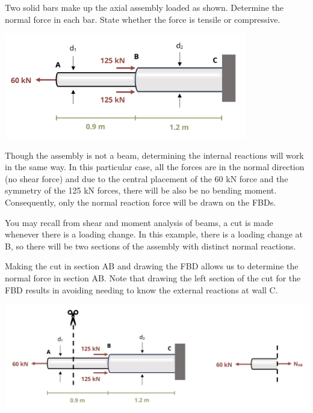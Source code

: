 \documentclass[
  letterpaper,
  DIV=11,
  numbers=noendperiod]{scrreprt}
\begin{document}
\begin{tcolorbox}[enhanced jigsaw, colbacktitle=quarto-callout-note-color!10!white, title={Example 1.5}, coltitle=black, leftrule=.75mm, rightrule=.15mm, opacityback=0, breakable, colframe=quarto-callout-note-color-frame, left=2mm, arc=.35mm, colback=white, bottomrule=.15mm, bottomtitle=1mm, toptitle=1mm, titlerule=0mm, opacitybacktitle=0.6, toprule=.15mm]

Two solid bars make up the axial assembly loaded as shown. Determine the
normal force in each bar. State whether the force is tensile or
compressive.

\begin{center}
\includegraphics[width=4.16667in,height=\textheight]{images/CH1 PNGs/example 1.5 part 1.png}
\end{center}

Though the assembly is not a beam, determining the internal reactions
will work in the same way. In this particular case, all the forces are
in the normal direction (no shear force) and due to the central
placement of the 60 kN force and the symmetry of the 125 kN forces,
there will be also be no bending moment. Consequently, only the normal
reaction force will be drawn on the FBDs.

You may recall from shear and moment analysis of beams, a cut is made
whenever there is a loading change. In this example, there is a loading
change at B, so there will be two sections of the assembly with distinct
normal reactions.

Making the cut in section AB and drawing the FBD allows us to determine
the normal force in section AB. Note that drawing the left section of
the cut for the FBD results in avoiding needing to know the external
reactions at wall C.

\begin{center}
\includegraphics{images/CH1 PNGs/example 1.5 part 2.png}
\end{center}


\end{tcolorbox}
\end{document}
